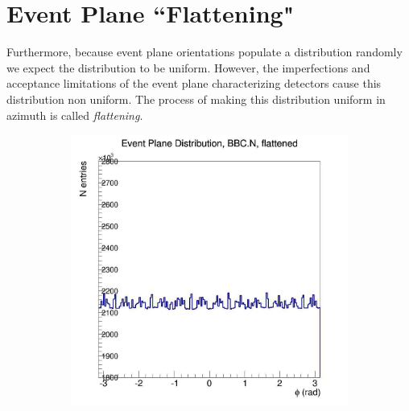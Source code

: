 \section{Event Plane ``Flattening"}
Furthermore, because event plane orientations populate a distribution randomly we expect the distribution to be uniform. However, the imperfections and acceptance limitations of the event plane characterizing detectors cause this distribution non uniform. The process of making this distribution uniform in azimuth is called \textit{flattening}.

\begin{figure}[htbp!]
  \centering
    \begin{subfigure}[p]{0.4\textwidth}
    \includegraphics[width=1\textwidth]{EPflattening/flatbbcn.jpg}
    \end{subfigure}
    \begin{subfigure}[p]{0.4\textwidth}

\end{subfigure}
\end{figure}
